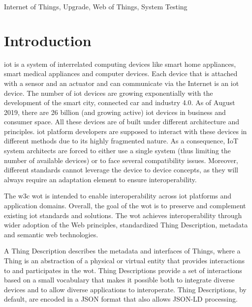 \documentclass[conference]{IEEEtran}
\theoremstyle{definition}
\begin{document}
\begin{IEEEkeywords}
Internet of Things, Upgrade, Web of Things, System Testing
\end{IEEEkeywords}

\section{Introduction} \label{introduction}

\ac{iot} is a system of interrelated computing devices like smart home appliances, smart medical appliances and computer devices. 
Each device that is attached with a sensor and an actuator and can communicate via the Internet is an \ac{iot} device. 
The number of \ac{iot} devices are growing exponentially with the development of the smart city, connected car and industry 4.0. 
As of August 2019, there are 26 billion (and growing active) \ac{iot} devices in business and consumer space.
All these devices are of built under different architecture and principles. 
\ac{iot} platform developers are supposed to interact with these devices in different methods due to its highly fragmented nature.  
As a consequence, IoT system architects are forced to either use a single system (thus limiting the number of available devices) or to face several compatibility issues. 
Moreover, different standards cannot leverage the device to device concepts, as they will always require an adaptation element to ensure interoperability. \cite{fantacci2014short}


The \ac{w3c} \ac{wot} is intended to enable interoperability across \ac{iot} platforms and application domains. 
Overall, the goal of the \ac{wot} is to preserve and complement existing \ac{iot} standards and solutions. 
The \ac{wot} achieves interoperability through wider adoption of the Web principles, standardized Thing Description, metadata and semantic web technologies. 

A Thing Description describes the metadata and interfaces of Things, where a Thing is an abstraction of a physical or virtual entity that provides interactions to and participates in the \ac{wot}. 
Thing Descriptions provide a set of interactions based on a small vocabulary that makes it possible both to integrate diverse devices and to allow diverse applications to interoperate. 
Thing Descriptions, by default, are encoded in a JSON format that also allows JSON-LD processing. 
\end{document}
